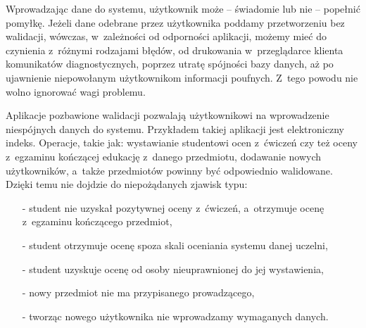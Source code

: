 \documentclass[openright]{xmgr}
\begin{document}
\maketitle
%
\introduction

\indent \indent \indent Wprowadzając dane do systemu, użytkownik może -- świadomie lub nie -- popełnić
pomyłkę. Jeżeli dane odebrane przez użytkownika poddamy przetworzeniu bez walidacji,
wówczas, w~zależności od odporności aplikacji, możemy mieć do czynienia z~różnymi
rodzajami błędów, od drukowania w~przeglądarce klienta komunikatów diagnostycznych,
poprzez utratę spójności bazy danych, aż po ujawnienie niepowołanym użytkownikom
informacji poufnych. Z~tego powodu nie wolno ignorować wagi problemu.

\indent Aplikacje pozbawione walidacji pozwalają użytkownikowi na wprowadzenie niespójnych
danych do systemu. Przykładem takiej aplikacji jest elektroniczny indeks. Operacje, takie jak: wystawianie studentowi ocen z~ćwiczeń
czy też oceny z~egzaminu kończącej edukację z~danego przedmiotu, dodawanie nowych użytkowników, a~także przedmiotów powinny być
odpowiednio walidowane. Dzięki temu nie dojdzie do niepożądanych zjawisk typu:
\begin{itemize}
\item[-] student nie uzyskał pozytywnej oceny z~ćwiczeń, a~otrzymuje ocenę z~egzaminu
kończącego przedmiot,
\item[-] student otrzymuje ocenę spoza skali oceniania systemu danej uczelni,
\item[-] student uzyskuje ocenę od osoby nieuprawnionej do jej wystawienia,
\item[-] nowy przedmiot nie ma przypisanego prowadzącego,
\item[-] tworząc nowego użytkownika nie wprowadzamy wymaganych danych.%
\end{itemize}
\end{document}
